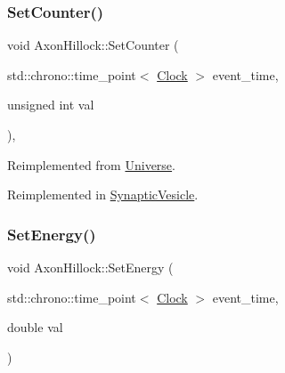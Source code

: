 \mbox{\label{classAxonHillock_a0220cee0ad99ddc48496982078c1856c}} 
\subsubsection{\texorpdfstring{Set\+Counter()}{SetCounter()}}
{\footnotesize\ttfamily void Axon\+Hillock\+::\+Set\+Counter (\begin{DoxyParamCaption}\item[{std\+::chrono\+::time\+\_\+point$<$ \mbox{\hyperlink{universe_8h_a0ef8d951d1ca5ab3cfaf7ab4c7a6fd80}{Clock}} $>$}]{event\+\_\+time,  }\item[{unsigned int}]{val }\end{DoxyParamCaption})\hspace{0.3cm}{\ttfamily [inline]}, {\ttfamily [virtual]}}



Reimplemented from \mbox{\hyperlink{classUniverse_aa22202ae740eb1355529afcb13285e91}{Universe}}.



Reimplemented in \mbox{\hyperlink{classSynapticVesicle_a7fd7cfce5eccb904206d968866f85220}{Synaptic\+Vesicle}}.

\mbox{\label{classAxonHillock_a830afd18810e0eaa11a9e7a500b8f0c4}} 
\subsubsection{\texorpdfstring{Set\+Energy()}{SetEnergy()}}
{\footnotesize\ttfamily void Axon\+Hillock\+::\+Set\+Energy (\begin{DoxyParamCaption}\item[{std\+::chrono\+::time\+\_\+point$<$ \mbox{\hyperlink{universe_8h_a0ef8d951d1ca5ab3cfaf7ab4c7a6fd80}{Clock}} $>$}]{event\+\_\+time,  }\item[{double}]{val }\end{DoxyParamCaption})\hspace{0.3cm}{\ttfamily [inline]}}

\mbox{\label{classAxonHillock_ad2c1890796e6f72ef631abb17a4b6532}} 

